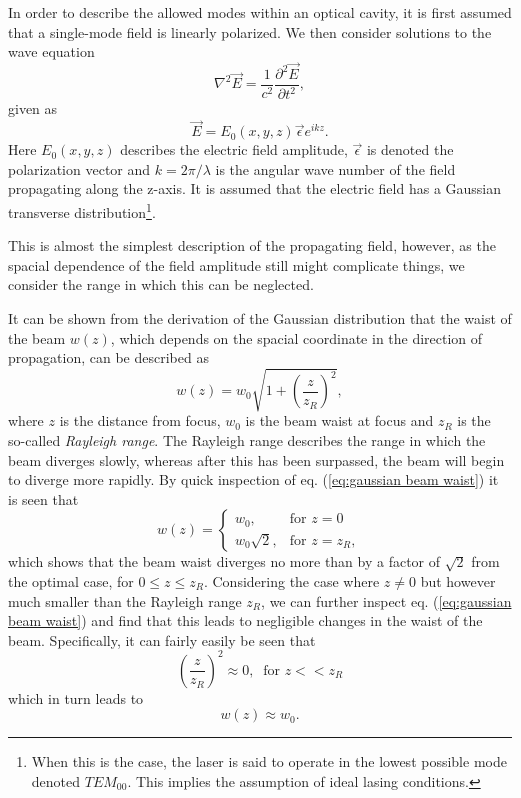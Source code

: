 In order to describe the allowed modes within an optical cavity, it is first assumed that a single-mode field is linearly polarized. We then consider solutions to the wave equation
\begin{equation}
    \nabla^2 \vec{E} = \frac{1}{c^2} \frac{\partial^2 \vec{E}}{\partial t^2},
\end{equation}
given as
\begin{equation}
    \vec{E} = E_0 (x,y,z) \vec{\epsilon} e^{i k z}. 
\end{equation}
Here $E_0(x,y,z)$ describes the electric field amplitude, $\vec{\epsilon}$ is denoted the polarization vector and $k=2 \pi / \lambda$ is the angular wave number of the field propagating along the z-axis. It is assumed that the electric field has a Gaussian transverse distribution\footnote{When this is the case, the laser is said to operate in the lowest possible mode denoted $TEM_{00}$. This implies the assumption of ideal lasing conditions.}.

This is almost the simplest description of the propagating field, however, as the spacial dependence of the field amplitude still might complicate things, we consider the range in which this can be neglected. 

It can be shown from the derivation of the Gaussian distribution that the waist of the beam $w(z)$, which depends on the spacial coordinate in the direction of propagation, can be described as \cite{Eichhorn}
\begin{equation}
    w(z) = w_0 \sqrt{1 + \left(\frac{z}{z_R}\right)^2},
    \label{eq:gaussian beam waist}
\end{equation}
where $z$ is the distance from focus, $w_0$ is the beam waist at focus and $z_R$ is the so-called \emph{Rayleigh range}. The Rayleigh range describes the range in which the beam diverges slowly, whereas after this has been surpassed, the beam will begin to diverge more rapidly. By quick inspection of eq. (\ref{eq:gaussian beam waist}) it is seen that
\begin{equation}
    w(z) = 
    \begin{cases}
        w_0, & \mbox{for } z=0 \\
        w_0\sqrt{2}, & \mbox{for } z=z_R,
    \end{cases}
\end{equation}
which shows that the beam waist diverges no more than by a factor of $\sqrt{2}$ from the optimal case, for $0\leq z \leq z_R$. Considering the case where $z \neq 0$ but however much smaller than the Rayleigh range $z_R$, we can further inspect eq. (\ref{eq:gaussian beam waist}) and find that this leads to negligible changes in the waist of the beam. Specifically, it can fairly easily be seen that
\begin{equation}
    \left(\frac{z}{z_R}\right)^2 \approx 0, \: \text{  for } z << z_R
\end{equation}
which in turn leads to 
\begin{equation}
    w(z) \approx w_0.
\end{equation}

